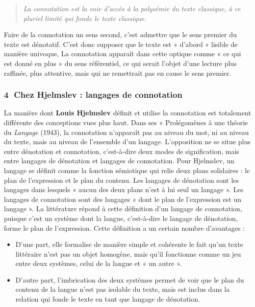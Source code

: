 \begin{quote}\small\itshape
La connotation est la voie d’accès à la polysémie du texte classique, à ce pluriel limité qui fonde le texte classique.
\end{quote}
Faire de la connotation un sens second, c’est admettre que le sens premier du texte est dénotatif. C’est donc supposer que le texte est « d’abord » lisible de manière univoque, La connotation apparaît dans cette optique comme « ce qui est donné en plus » du sens référentiel, ce qui serait l’objet d’une lecture plus raffinée, plus attentive, mais qui ne remettrait pas en cause le sens premier.

\subsubsection*{\textcircled{\scriptsize 4} Chez Hjelmslev : langages de connotation}
La manière dont \textbf{Louis Hjelmslev} définit et utilise la connotation est totalement différente des conceptions vues plus haut. Dans ses « Prolégomènes à une théorie du \textit{Langage} (1943), la connotation n’apparaît pas au niveau du mot, ni au niveau du texte, mais au niveau de l’ensemble d’un langage. L’opposition ne se situe plus entre dénotation et connotation, c’est-à-dire deux modes de signification, mais entre langages de dénotation et langages de connotation. Pour Hjelmslev, un langage se définit comme la fonction sémiotique qui relie deux plans solidaires : le plan de l’expression et le plan du contenu. Les langages de dénotation sont les langages dans lesquels « aucun des deux plans n’est à lui seul un langage ». Les langages de connotation sont des langages « dont le plan de l’expression est un langage ». La littérature répond à cette définition d’un langage de connotation, puisque c’est un système dont la langue, c’est-à-dire le langage de dénotation, forme le plan de l’expression. Cette définition a un certain nombre d’avantages :
\begin{itemize}
\item D’une part, elle formalise de manière simple et cohérente le fait qu’un texte littéraire n’est pas un objet homogène, mais qu’il fonctionne comme un jeu entre deux systèmes, celui de la langue et « un autre ».
\item D’autre part, l’imbrication des deux systèmes permet de voir que le plan du contenu de la langue n’est pas isolable du texte, mais est inclus dans la relation qui fonde le texte en tant que langage de dénotation.
\end{itemize}
